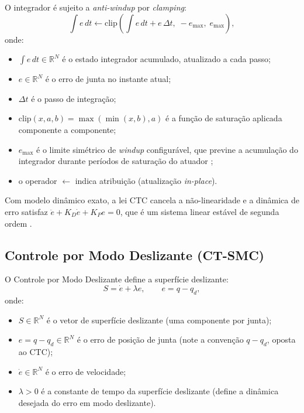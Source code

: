 O integrador é sujeito a \textit{anti-windup} por \textit{clamping}:
\begin{equation}
    \int e\,dt \leftarrow \text{clip}\!\left(\int e\,dt + e\,\Delta t,\;  -e_{\max},\; e_{\max}\right),
    \label{eq:antiwindup}
\end{equation}
onde:
\begin{itemize}
    \item $\int e\,dt \in \mathbb{R}^N$ é o estado integrador acumulado, atualizado a cada passo;
    \item $e \in \mathbb{R}^N$ é o erro de junta no instante atual;
    \item $\Delta t$ é o passo de integração;
    \item $\text{clip}(x, a, b) = \max(\min(x, b), a)$ é a função de saturação aplicada componente a componente;
    \item $e_{\max}$ é o limite simétrico de \textit{windup} configurável, que previne a acumulação do integrador durante períodos de saturação do atuador \cite{astrom1995theory};
    \item o operador $\leftarrow$ indica atribuição (atualização \textit{in-place}).
\end{itemize} Com modelo dinâmico exato, a lei CTC cancela a não-linearidade e a dinâmica de erro satisfaz $\ddot{e} + K_D\dot{e} + K_P e = 0$, que é um sistema linear estável de segunda ordem \cite{craig1989introduction}.

\subsection{Controle por Modo Deslizante (CT-SMC)}

O Controle por Modo Deslizante \cite{slotine1991applied} define a superfície deslizante:
\begin{equation}
    S = \dot{e} + \lambda e, \qquad e = q - q_d,
    \label{eq:sliding_surface}
\end{equation}
onde:
\begin{itemize}
    \item $S \in \mathbb{R}^N$ é o vetor de superfície deslizante (uma componente por junta);
    \item $e = q - q_d \in \mathbb{R}^N$ é o erro de posição de junta (note a convenção $q - q_d$, oposta ao CTC);
    \item $\dot{e} \in \mathbb{R}^N$ é o erro de velocidade;
    \item $\lambda > 0$ é a constante de tempo da superfície deslizante (define a dinâmica desejada do erro em modo deslizante).
\end{itemize}

